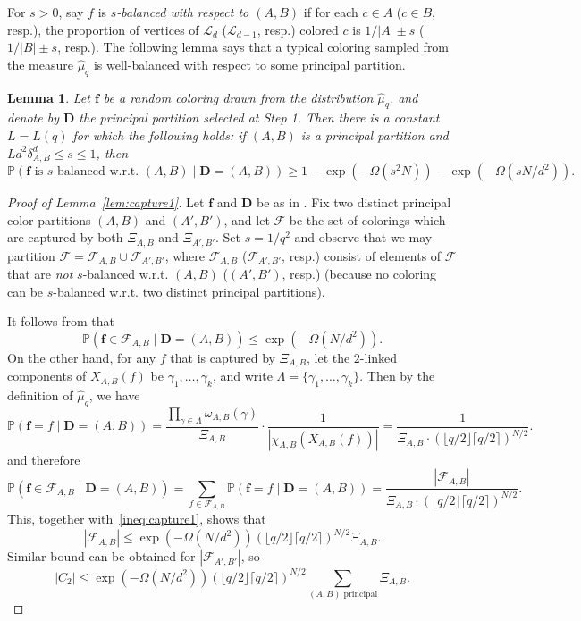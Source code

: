 \documentclass{amsart}
\newtheorem{lem}[thm]{Lemma}
\theoremstyle{definition}
\newcommand{\we}{\omega}
\newcommand{\cF}{\mathcal{F} }
\newcommand{\cL}{\mathcal{L} }
\newcommand{\0}[0]{\emptyset}
\newcommand{\pr}[0]{\mathbb{P}}
\begin{document}
For $s>0$, say $f$ is \textit{$s$-balanced with respect to $(A, B)$} if for each $c\in A$ ($c \in B$, resp.), the proportion of vertices of $\cL_d$ ($\cL_{d-1}$, resp.) colored $c$ is $1/|A|\pm s$ ($1/|B|\pm s$, resp.). The following lemma says that a typical coloring sampled from the measure $\hat{\mu}_q$ is well-balanced with respect to some principal partition.



\begin{lem}\label{lem:defect.shorten}
Let $\mathbf f$ be a random coloring drawn from the distribution $\hat{\mu}_q$, and denote by $\mathbf D$ the principal partition selected at Step 1.
Then there is a constant $L=L(q)$ for which the following holds: if $(A, B)$ is a principal partition and $Ld^2\delta_{A, B}^d \leq s\leq 1$, then
\[
\pr\left(\text{$\mathbf f$ is $s$-balanced w.r.t. $(A, B)$} \mid \mathbf D=(A, B) \right) \geq 1 - \exp\left(-\Omega\left(s^2N\right)\right) - \exp\left(-\Omega\left(sN/d^2\right)\right).
\]

\end{lem}


\begin{proof}[Proof of Lemma~\ref{lem:capture1}]
Let $\mathbf f$ and $\mathbf D$ be as in . 
Fix two distinct principal color partitions $(A, B)$ and $(A', B')$, and let $\cF$ be the set of colorings which are captured by both $\Xi_{A, B}$ and $\Xi_{A', B'}$. Set $s=1/q^2$ and observe that we may partition $\cF=\cF_{A, B}\cup \cF_{A', B'}$, where $\cF_{A, B}$ ($\cF_{A', B'}$, resp.) consist of elements of $\cF$ that are \textit{not} $s$-balanced w.r.t. $(A, B)$ ($(A', B')$, resp.) (because no coloring can be $s$-balanced w.r.t. two distinct principal partitions).

It follows from  that
\begin{equation}\label{ineq:capture1}
\pr\left( \mathbf f\in\cF_{A, B} \mid \mathbf D=(A, B) \right) \leq \exp\left(-\Omega\left(N/d^2\right)\right).
\end{equation}
On the other hand, for any $f$ that is captured by $\Xi_{A, B}$, let the $2$-linked components of $X_{A, B}(f)$ be $\gamma_1, \ldots, \gamma_k$, and write $\Lambda=\{\gamma_1, \ldots, \gamma_k\}$. Then by the definition of $\hat{\mu}_q$, we have
\[
\pr\left( \mathbf f=f \mid \mathbf D=(A, B) \right) = \frac{\prod_{\gamma\in \Lambda}\we_{A, B}(\gamma)}{\Xi_{A,B}}\cdot\frac{1}{|\chi_{A, B}(X_{A, B}(f))|} = \frac{1}{\Xi_{A,B}\cdot(\lfloor q/2 \rfloor\lceil q/2 \rceil)^{N/2}}.
\]
and therefore
\[
\pr\left( \mathbf f\in\cF_{A, B} \mid \mathbf D=(A, B) \right)=\sum_{f\in \cF_{A, B}}\pr\left( \mathbf f=f \mid \mathbf D=(A, B) \right) =\frac{|\cF_{A, B}|}{\Xi_{A,B}\cdot(\lfloor q/2 \rfloor\lceil q/2 \rceil)^{N/2}}.
\]
This, together with~\eqref{ineq:capture1}, shows that
\[
|\cF_{A, B}| \leq \exp\left(-\Omega\left(N/d^2\right)\right)(\lfloor q/2 \rfloor\lceil q/2 \rceil)^{N/2}\Xi_{A,B}.
\]
Similar bound can be obtained for $|\cF_{A', B'}|$, so 
\[
|C_2| \leq \exp\left(-\Omega\left(N/d^2\right)\right)(\lfloor q/2 \rfloor\lceil q/2 \rceil)^{N/2}\sum_{(A, B) \text{ principal}}\Xi_{A, B}.
\]
\end{proof}
\end{document}
